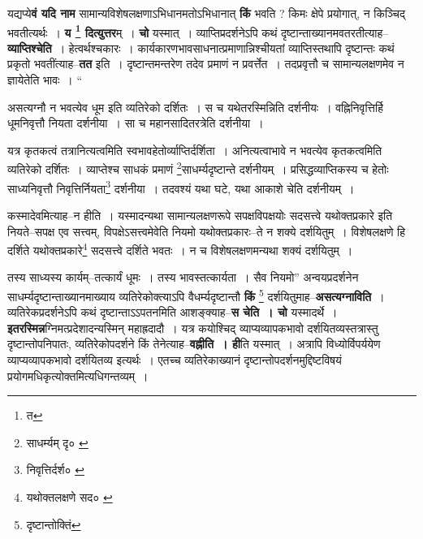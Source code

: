\documentclass[article,12pt,a4paper]{memoir}
\begin{document}
	  \pstart यद्यप्ये\textbf{वं यदि नाम} सामान्यविशेषलक्षणाऽभिधानमतोऽभिधानात् \textbf{किं} भवति ? किमः क्षेपे प्रयोगात्, न किञ्चिद् भवतीत्यर्थः । \textbf{य \footnote{त} दित्युत्तर}म् । \textbf{चो} यस्मात् । व्याप्तिप्रदर्शनेऽपि कथं दृष्टान्ताख्यानमवतरतीत्याह--\textbf{व्याप्तिश्चेति} । हेत्वर्थश्चकारः । कार्यकारणभावसाधनात्प्रमाणान्निश्चीयतां व्याप्तिस्तथापि दृष्टान्तः कथं प्रकृतो भवतींत्याह--\textbf{तत} इति । दृष्टान्तमन्तरेण तदेव प्रमाणं न प्रवर्त्तेत । तदप्रवृत्तौ च सामान्यलक्षणमेव न ज्ञायेतेति भावः ।  \leavevmode{} “
	  
	असत्यग्नौ न भवत्येव धूम इति व्यतिरेको दर्शितः । स च यथेतरस्मिन्निति दर्शनीयः । वह्निनिवृत्तिर्हि धूमनिवृत्तौ नियता दर्शनीया । सा च महानसादितरत्रेति दर्शनीया । 
	  
	यत्र कृतकत्वं तत्रानित्यत्वमिति स्वभावहेतोर्व्याप्तिर्दर्शिता । अनित्यत्वाभावे न भवत्येव कृतकत्वमिति व्यतिरेको दर्शितः । व्याप्तेश्च साधकं प्रमाणं \footnote{साधर्म्यम् दृ० \cite{dp-msB}}साधर्म्यदृष्टान्ते दर्शनीयम् । प्रसिद्धव्याप्तिकस्य च हेतोः साध्यनिवृत्तौ निवृत्तिर्नियता\footnote{निवृत्तिर्दर्श० \cite{dp-msA} \cite{dp-msB} \cite{dp-msD} \cite{dp-edP} \cite{dp-edH} \cite{dp-edN} \cite{dp-edE}} दर्शनीया । तदवश्यं यथा घटे, यथा आकाशे चेति दर्शनीयम् । 
	  
	कस्मादेवमित्याह--न हीति । यस्मादन्यथा सामान्यलक्षणरूपे सपक्षविपक्षयोः सदसत्त्वे यथोक्तप्रकारे इति नियते--सपक्ष एव सत्त्वम्, विपक्षेऽसत्त्वमेवेति नियमो यथोक्तप्रकारः--ते न शक्ये दर्शयितुम् । विशेषलक्षणे हि दर्शिते यथोक्तप्रकारे\footnote{यथोक्तलक्षणे सद० \cite{dp-msC}} सदसत्त्वे दर्शिते भवतः । न च विशेषलक्षणमन्यथा शक्यं दर्शयितुम् । 
	  
	तस्य साध्यस्य कार्यम्--तत्कार्यं धूमः । तस्य भावस्तत्कार्यता । सैव नियमो” अन्वयप्रदर्शनेन साधर्म्यदृष्टान्ताख्यानमाख्याय व्यतिरेकोक्त्याऽपि वैधर्म्यदृष्टान्तौ \textbf{किं} \footnote{दृष्टान्तोक्तिं} दर्शयितुमाह--\textbf{असत्यग्नाविति} । व्यतिरेकप्रदर्शनेऽपि कथं दृष्टान्ताऽऽपतनमिति आशङ्क्याह--\textbf{स चेति । चो} यस्मादर्थे । \textbf{इतरस्मिन्न}ग्निमत्प्रदेशादन्यस्मिन् महाह्रदादौ । यत्र कयोश्चिद् व्याप्यव्यापकभावो दर्शयितव्यस्तत्रास्तु दृष्टान्तोपनिपातः, व्यतिरेकोपदर्शने किं तेनेत्याह--\textbf{वह्नीति । ही}ति यस्मात् । अत्रापि विध्योर्विपर्ययेण व्याप्यव्यापकभावो दर्शयितव्य इत्यर्थः । एतच्च व्यतिरेकाख्यानं दृष्टान्तोपदर्शनमुद्दिष्टविषयं प्रयोगमधिकृत्योक्तमित्यधिगन्तव्यम् ।
	\pend
      
\end{document}
